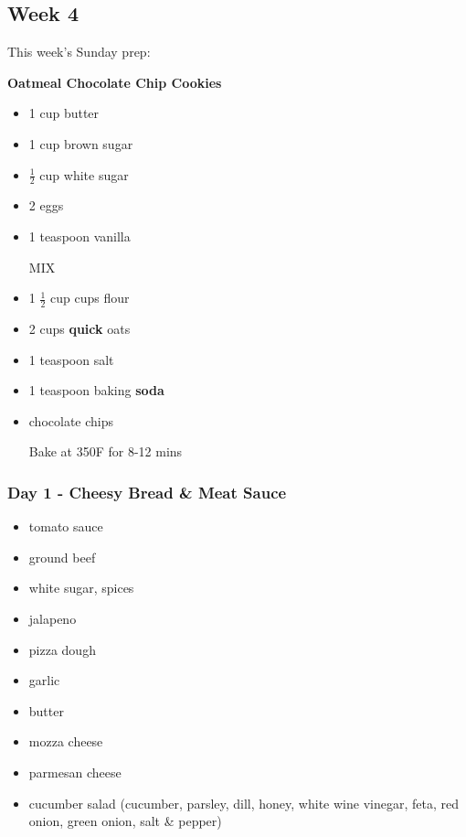 \documentclass[11pt, a4paper]{article}
\begin{document}
\vspace{0.917 pc} %


\pagebreak
\subsection{Week 4}

This week's Sunday prep:
\par
\vspace{1pc}
\noindent\textbf{Oatmeal Chocolate Chip Cookies}
\par

\begin{itemize}
\item 1 cup butter
\item 1 cup brown sugar
\item $\frac{1}{2}$ cup white sugar
\item 2 eggs
\item 1 teaspoon vanilla
\par
MIX
\item 1 $\frac{1}{2}$ cup cups flour
\item 2 cups \textbf{quick} oats
\item 1 teaspoon salt
\item 1 teaspoon baking \textbf{soda}
\item chocolate chips
\par
Bake at 350F for 8-12 mins
\end{itemize}

\subsubsection{Day 1 - Cheesy Bread \& Meat Sauce}
\vspace{1pc}
\begin{itemize}
\item tomato sauce 
\item ground beef 
\item white sugar, spices 
\item jalapeno 
\item pizza dough 
\item garlic 
\item butter 
\item mozza cheese 
\item parmesan cheese 
\item cucumber salad (cucumber, parsley, dill, honey, white wine vinegar, feta, red onion, green onion, salt \& pepper) 
\end{itemize}
\end{document}

